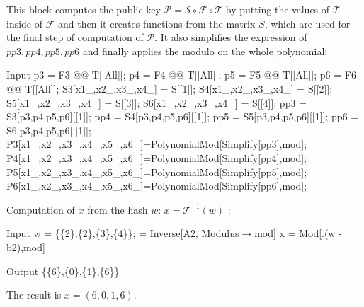 \documentclass[thesis=M,english]{FITthesis}[2019/12/23]
\begin{document}
\noindent
This block computes the public key $\mathcal{P} = \mathcal{S} \circ \mathcal{F} \circ \mathcal{T}$ by putting the values of $\mathcal{T}$ inside of $\mathcal{F}$ and then it creates functions from the matrix $S$, which are used for the final step of computation of $\mathcal{P}$. It also simplifies the expression of $pp3,pp4,pp5,pp6$ and finally applies the modulo on the whole polynomial:
\begin{mmaCell}[moredefined={p3, p4, p5, p6, S3, S4, S5, S6, mod, P3, P4, P5, P6, pp3,pp4,pp5,pp6, F3, F4, F5,F6, T, S},morepattern={x1_, x2_, x3_, x4_, x5_, x6_},leftmargin=1.5em]{Input}
p3 = F3 @@ T[[All]];
p4 = F4 @@ T[[All]];
p5 = F5 @@ T[[All]];
p6 = F6 @@ T[[All]];
S3[x1_,x2_,x3_,x4_] = S[[1]];
S4[x1_,x2_,x3_,x4_] = S[[2]];
S5[x1_,x2_,x3_,x4_] = S[[3]];
S6[x1_,x2_,x3_,x4_] = S[[4]];
pp3 = S3[p3,p4,p5,p6][[1]];
pp4 = S4[p3,p4,p5,p6][[1]];
pp5 = S5[p3,p4,p5,p6][[1]];
pp6 = S6[p3,p4,p5,p6][[1]];
P3[x1_,x2_,x3_,x4_,x5_,x6_]=PolynomialMod[Simplify[pp3],mod];
P4[x1_,x2_,x3_,x4_,x5_,x6_]=PolynomialMod[Simplify[pp4],mod];
P5[x1_,x2_,x3_,x4_,x5_,x6_]=PolynomialMod[Simplify[pp5],mod];
P6[x1_,x2_,x3_,x4_,x5_,x6_]=PolynomialMod[Simplify[pp6],mod];
\end{mmaCell}

\noindent
Computation of $x$ from the hash $w$: $x = \mathcal{T}^{-1}(w)$ :
\begin{mmaCell}[moredefined={w, A2, b2, S, x, mod}]{Input}
w = \{\{2\},\{2\},\{3\},\{4\}\};
 = Inverse[A2, Modulus\(\pmb{\to}\)mod]
x = Mod[.(w - b2),mod]
\end{mmaCell}
\begin{mmaCell}{Output}
\{\{6\},\{0\},\{1\},\{6\}\}
\end{mmaCell}

\noindent
The result is $x = (6,0,1,6)$.
\end{document}

